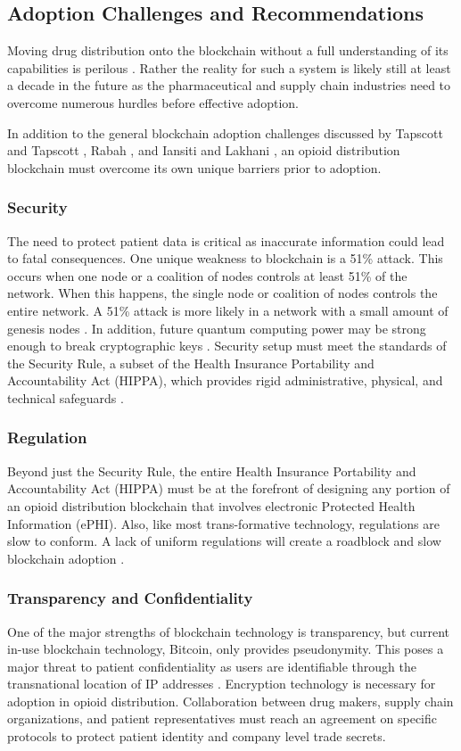 \documentclass[sigconf]{acmart}
\begin{document}
\subsection{Adoption Challenges and Recommendations}
Moving drug distribution onto the blockchain without a full understanding of its capabilities is perilous \cite{hbr}. Rather the reality for such a system is likely still at least a decade in the future as the pharmaceutical and supply chain industries need to overcome numerous hurdles before effective adoption.

In addition to the general blockchain adoption challenges discussed by Tapscott and Tapscott \cite{tapscott}, Rabah \cite{rabah2017overview}, and Iansiti and Lakhani \cite{hbr}, an opioid distribution blockchain must overcome its own unique barriers prior to adoption.

\subsubsection{Security} The need to protect patient data is critical as inaccurate information could lead to fatal consequences. One unique weakness to blockchain is a 51\% attack. This occurs when one node or a coalition of nodes controls at least 51\% of the network. When this happens, the single node or coalition of nodes controls the entire network. A 51\% attack is more likely in a network with a small amount of genesis nodes \cite{Beikverdi01}. In addition, future quantum computing power may be strong enough to break cryptographic keys \cite{hitchingHealthcare}. Security setup must meet the standards of the Security Rule, a subset of the Health Insurance Portability and Accountability Act (HIPPA), which provides rigid administrative, physical, and technical safeguards \cite{Henderson01}.

\subsubsection{Regulation} Beyond just the Security Rule, the entire Health Insurance Portability and Accountability Act (HIPPA) must be at the forefront of designing any portion of an opioid distribution blockchain that involves electronic Protected Health Information (ePHI). Also, like most trans-formative technology, regulations are slow to conform. A lack of uniform regulations will create a roadblock and slow blockchain adoption \cite{Henderson01}.

\subsubsection{Transparency and Confidentiality} One of the major strengths of blockchain technology is transparency, but current in-use blockchain technology, Bitcoin, only provides pseudonymity. This poses a major threat to patient confidentiality as users are identifiable through the transnational location of IP addresses \cite{Biryukov01}. Encryption technology is necessary for adoption in opioid distribution. Collaboration between drug makers, supply chain organizations, and patient representatives must reach an agreement on specific protocols to protect patient identity and company level trade secrets.
\end{document}

